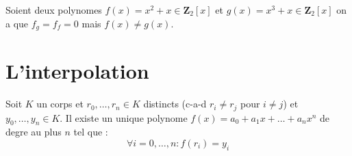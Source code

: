 \begin{example}
Soient  deux polynomes $f(x)=x^{2}+x \in \mathbf{Z}_{2}[x]$ et $g(x)=x^{3}+x \in \mathbf{Z}_{2}[x]$ on a que $f_{g}=f_{f}=0$ mais $f(x)\neq g(x)$.
\end{example}
\section{L'interpolation}

\begin{theorem}
Soit $K$ un corps et $r_{0},\dots,r_{n}\in K$ distincts (c-a-d $r_{i}\neq r_{j}$ pour $i\neq j$) et $y_{0},\dots,y_{n}\in K$. Il existe un unique polynome $f(x)=a_{0}+a_{1}x+\dots+a_{n}x^{n}$ de degre au plus $n$ tel que :
$$
\forall i=0,\dots,n:f(r_{i})=y_{i}
$$

\end{theorem}
